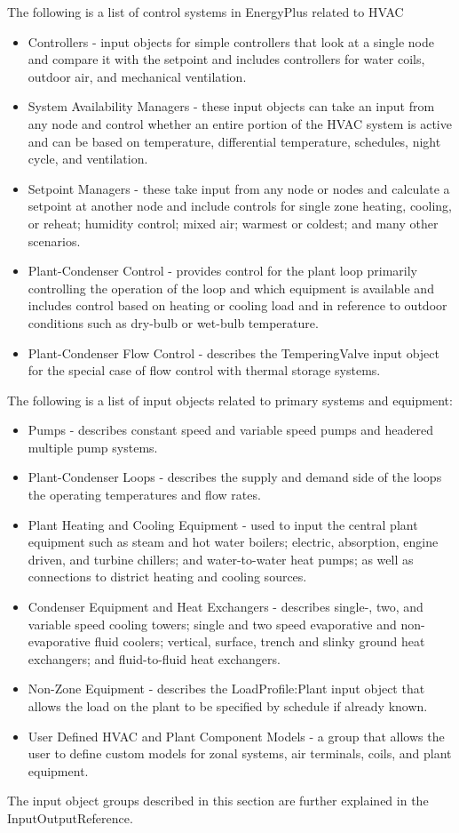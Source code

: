 The following is a list of control systems in EnergyPlus related to
HVAC
\begin{itemize}
\item Controllers - input objects for simple controllers that look at a
single node and compare it with the setpoint and includes controllers
for water coils, outdoor air, and mechanical ventilation.
\item System Availability Managers - these input objects can take an input
from any node and control whether an entire portion of the HVAC system
is active and can be based on temperature, differential temperature,
schedules, night cycle, and ventilation.
\item Setpoint Managers - these take input from any node or nodes and calculate
a setpoint at another node and include controls for single zone heating,
cooling, or reheat; humidity control; mixed air; warmest or coldest;
and many other scenarios.
\item Plant-Condenser Control - provides control for the plant loop primarily
controlling the operation of the loop and which equipment is available
and includes control based on heating or cooling load and in reference
to outdoor conditions such as dry-bulb or wet-bulb temperature.
\item Plant-Condenser Flow Control - describes the TemperingValve input
object for the special case of flow control with thermal storage systems.
\end{itemize}
The following is a list of input objects related to primary systems
and equipment:
\begin{itemize}
\item Pumps - describes constant speed and variable speed pumps and headered
multiple pump systems.
\item Plant-Condenser Loops - describes the supply and demand side of the
loops the operating temperatures and flow rates.
\item Plant Heating and Cooling Equipment - used to input the central plant
equipment such as steam and hot water boilers; electric, absorption,
engine driven, and turbine chillers; and water-to-water heat pumps;
as well as connections to district heating and cooling sources.
\item Condenser Equipment and Heat Exchangers - describes single-, two,
and variable speed cooling towers; single and two speed evaporative
and non-evaporative fluid coolers; vertical, surface, trench and slinky
ground heat exchangers; and fluid-to-fluid heat exchangers.
\item Non-Zone Equipment - describes the LoadProfile:Plant input object
that allows the load on the plant to be specified by schedule if already
known.
\item User Defined HVAC and Plant Component Models - a group that allows
the user to define custom models for zonal systems, air terminals,
coils, and plant equipment.
\end{itemize}
The input object groups described in this section are further explained
in the InputOutputReference.

